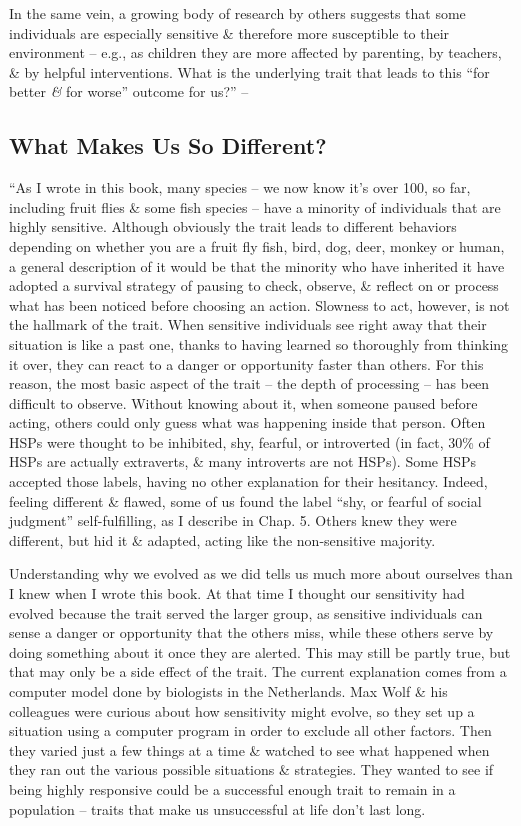 \documentclass{article}
\numberwithin{equation}{section}
\begin{document}
In the same vein, a growing body of research by others suggests that some individuals are especially sensitive \& therefore more susceptible to their environment -- e.g., as children they are more affected by parenting, by teachers, \& by helpful interventions. What is the underlying trait that leads to this ``for better \textit{\&} for worse'' outcome for us?'' -- \cite[pp. 12--14]{Aron2013}

\subsection*{What Makes Us So Different?}
``As I wrote in this book, many species -- we now know it's over 100, so far, including fruit flies \& some fish species -- have a minority of individuals that are highly sensitive. Although obviously the trait leads to different behaviors depending on whether you are a fruit fly fish, bird, dog, deer, monkey or human, a general description of it would be that the minority who have inherited it have adopted a survival strategy of pausing to check, observe, \& reflect on or process what has been noticed before choosing an action. Slowness to act, however, is not the hallmark of the trait. When sensitive individuals see right away that their situation is like a past one, thanks to having learned so thoroughly from thinking it over, they can react to a danger or opportunity faster than others. For this reason, the most basic aspect of the trait -- the depth of processing -- has been difficult to observe. Without knowing about it, when someone paused before acting, others could only guess what was happening inside that person. Often HSPs were thought to be inhibited, shy, fearful, or introverted (in fact, 30\% of HSPs are actually extraverts, \& many introverts are not HSPs). Some HSPs accepted those labels, having no other explanation for their hesitancy. Indeed, feeling different \& flawed, some of us found the label ``shy, or fearful of social judgment'' self-fulfilling, as I describe in Chap. 5. Others knew they were different, but hid  it \& adapted, acting like the non-sensitive majority.

Understanding why we evolved as we did tells us much more about ourselves than I knew when I wrote this book. At that time I thought our sensitivity had evolved because the trait served the larger group, as sensitive individuals can sense a danger or opportunity that the others miss, while these others serve by doing something about it once they are alerted. This may still be partly true, but that may only be a side effect of the trait. The current explanation comes from a computer model done by biologists in the Netherlands. Max Wolf \& his colleagues were curious about how sensitivity might evolve, so they set up a situation using a computer program in order to exclude all other factors. Then they varied just a few things at a time \& watched to see what happened when they ran out the various possible situations \& strategies. They wanted to see if being highly responsive could be a successful enough trait to remain in a population -- traits that make us unsuccessful at life don't last long.
\end{document}
